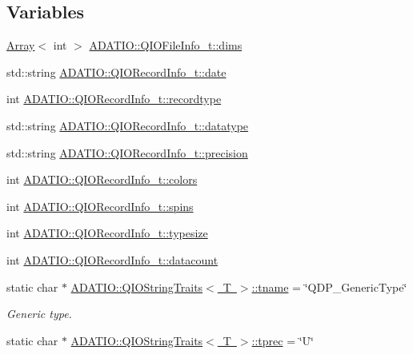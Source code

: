 \subsection*{Variables}
\begin{DoxyCompactItemize}
\item 
\mbox{\hyperlink{classXMLArray_1_1Array}{Array}}$<$ int $>$ \mbox{\hyperlink{group__qio_ga29f30bb416493194287e2a1314e99c86}{A\+D\+A\+T\+I\+O\+::\+Q\+I\+O\+File\+Info\+\_\+t\+::dims}}
\item 
std\+::string \mbox{\hyperlink{group__qio_ga1894a21fc67312581fac55295c8941e6}{A\+D\+A\+T\+I\+O\+::\+Q\+I\+O\+Record\+Info\+\_\+t\+::date}}
\item 
int \mbox{\hyperlink{group__qio_ga88cd070912edbe6d09a2437d3d9c6d08}{A\+D\+A\+T\+I\+O\+::\+Q\+I\+O\+Record\+Info\+\_\+t\+::recordtype}}
\item 
std\+::string \mbox{\hyperlink{group__qio_ga62e8335fcf5ac25dc36eaeee8519ee64}{A\+D\+A\+T\+I\+O\+::\+Q\+I\+O\+Record\+Info\+\_\+t\+::datatype}}
\item 
std\+::string \mbox{\hyperlink{group__qio_gaba8466af5dd242de9e6d63fc5112e6df}{A\+D\+A\+T\+I\+O\+::\+Q\+I\+O\+Record\+Info\+\_\+t\+::precision}}
\item 
int \mbox{\hyperlink{group__qio_gad7bee26b17d771036f2b87c847328b24}{A\+D\+A\+T\+I\+O\+::\+Q\+I\+O\+Record\+Info\+\_\+t\+::colors}}
\item 
int \mbox{\hyperlink{group__qio_ga1a819261ad8c96e3e9378fc74742b1f4}{A\+D\+A\+T\+I\+O\+::\+Q\+I\+O\+Record\+Info\+\_\+t\+::spins}}
\item 
int \mbox{\hyperlink{group__qio_ga415fb0076e8a07dddb97c8c5d6ea08f9}{A\+D\+A\+T\+I\+O\+::\+Q\+I\+O\+Record\+Info\+\_\+t\+::typesize}}
\item 
int \mbox{\hyperlink{group__qio_ga8051a480bb96231cfa758ddfab5ed415}{A\+D\+A\+T\+I\+O\+::\+Q\+I\+O\+Record\+Info\+\_\+t\+::datacount}}
\item 
static char $\ast$ \mbox{\hyperlink{group__qio_ga14189398447447c3ff6d039d05033619}{A\+D\+A\+T\+I\+O\+::\+Q\+I\+O\+String\+Traits$<$ T $>$\+::tname}} = \char`\"{}Q\+D\+P\+\_\+\+Generic\+Type\char`\"{}
\begin{DoxyCompactList}\small\item\em Generic type. \end{DoxyCompactList}\item 
static char $\ast$ \mbox{\hyperlink{group__qio_ga94d948248c229ef3f2935069425f550a}{A\+D\+A\+T\+I\+O\+::\+Q\+I\+O\+String\+Traits$<$ T $>$\+::tprec}} = \char`\"{}U\char`\"{}

\end{DoxyCompactItemize}
